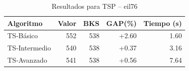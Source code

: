 \begin{table}[h]
\centering
\caption{Resultados para TSP -- eil76}
\label{tab:tsp_eil76}
\begin{tabular}{lrrrr}
\hline
\textbf{Algoritmo} & \textbf{Valor} & \textbf{BKS} & \textbf{GAP(\%)} & \textbf{Tiempo (s)} \\
\hline
TS-Básico & 552 & 538 & +2.60 & 1.60 \\
TS-Intermedio & 540 & 538 & +0.37 & 3.16 \\
TS-Avanzado & 541 & 538 & +0.56 & 7.64 \\
\hline
\end{tabular}
\end{table}
